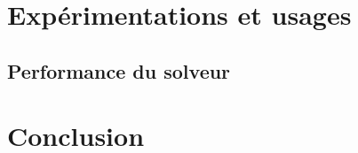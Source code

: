 \documentclass[a4paper,12pt]{article} %
\begin{document}
\section{Expérimentations et usages}

\subsection{Performance du solveur}

\section*{Conclusion}
\end{document}
